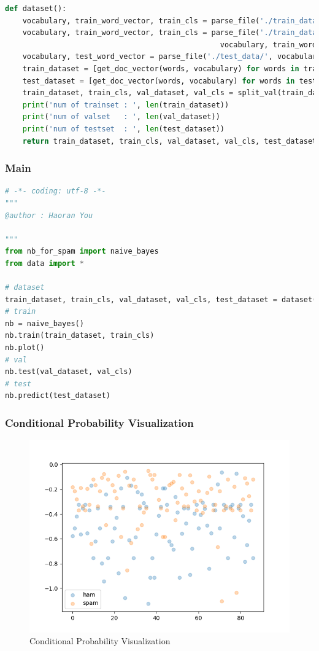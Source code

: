 \documentclass[UTF-8, a4paper, 11pt]{article}
\numberwithin{equation}{section}
\begin{document}
\begin{lstlisting}[language=python]
def dataset():
    vocabulary, train_word_vector, train_cls = parse_file('./train_data/ham/', [], [], [])
    vocabulary, train_word_vector, train_cls = parse_file('./train_data/spam/',
                                                 vocabulary, train_word_vector, train_cls)
    vocabulary, test_word_vector = parse_file('./test_data/', vocabulary, [], [], False)
    train_dataset = [get_doc_vector(words, vocabulary) for words in train_word_vector]
    test_dataset = [get_doc_vector(words, vocabulary) for words in test_word_vector]
    train_dataset, train_cls, val_dataset, val_cls = split_val(train_dataset, train_cls)
    print('num of trainset : ', len(train_dataset))
    print('num of valset   : ', len(val_dataset))
    print('num of testset  : ', len(test_dataset))
    return train_dataset, train_cls, val_dataset, val_cls, test_dataset
\end{lstlisting}
\newpage
\subsubsection{Main}
\begin{lstlisting}[language=python]
# -*- coding: utf-8 -*-
"""
@author : Haoran You

"""
from nb_for_spam import naive_bayes
from data import *

# dataset
train_dataset, train_cls, val_dataset, val_cls, test_dataset = dataset()
# train
nb = naive_bayes()
nb.train(train_dataset, train_cls)
nb.plot()
# val
nb.test(val_dataset, val_cls)
# test
nb.predict(test_dataset)
\end{lstlisting}
\subsubsection{Conditional Probability Visualization}
\begin{figure}[!htbp]
  \centering
  \includegraphics[width=16cm]{cond_fig.png}
  \caption{Conditional Probability Visualization}\label{condition}
\end{figure}
\end{document}
